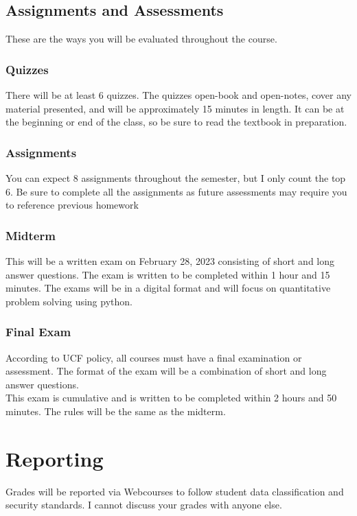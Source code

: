 \documentclass[11pt]{paper}
\begin{document}
\subsection{Assignments and Assessments}

These are the ways you will be evaluated throughout the course.

\subsubsection{Quizzes}
There will be at least 6 quizzes. The quizzes open-book and open-notes, cover any material presented, and will be approximately 15 minutes in length. It can be at the beginning or end of the class, so be sure to read the textbook in preparation.

\subsubsection{Assignments}
You can expect 8 assignments throughout the semester, but I only count the top 6. Be sure to complete all the assignments as future assessments may require you to reference previous homework

\subsubsection{Midterm}
This will be a written exam on February 28, 2023 consisting of short and long answer questions. The exam is written to be completed within 1 hour and 15 minutes. The exams will be in a digital format and will focus on quantitative problem solving using python.

\subsubsection{Final Exam}
According to UCF policy, all courses must have a final examination or assessment. The format of the exam will be a combination of short and long answer questions.\\

This exam is cumulative and is written to be completed within 2 hours and 50 minutes. The rules will be the same as the midterm.

\section{Reporting}
Grades will be reported via Webcourses to follow student data classification and security standards. I cannot discuss your grades with anyone else.
\end{document}
